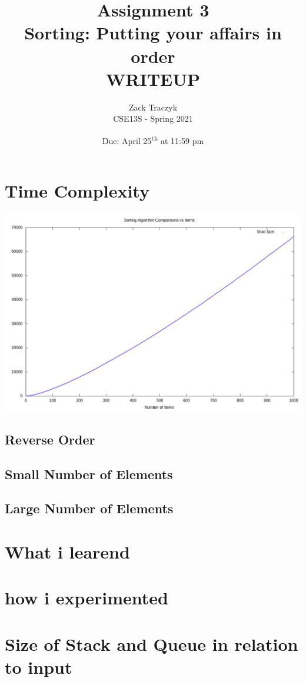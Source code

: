 \documentclass[12pt]{article}
\title{%
	\textbf{Assignment 3 \\ 
	Sorting: Putting your affairs in order \\
	\large WRITEUP} }
\author{Zack Traczyk \\ CSE13S - Spring 2021}
\date{Due: April 25\textsuperscript{th} at 11:59 pm}
\begin{document}
	\maketitle

	\section{Time Complexity}
	
	\includegraphics{shell}

	\subsection{Reverse Order}

	\subsection{Small Number of Elements}

	\subsection{Large Number of Elements}

	\section{What i learend}

	\section{how i experimented}

	\section{Size of Stack and Queue in relation to input}

	
\end{document}
